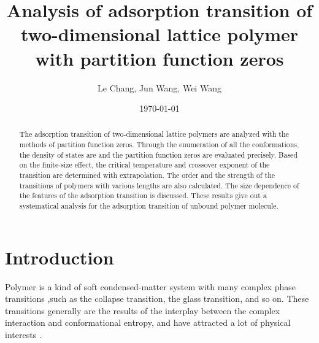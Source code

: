 \documentclass[aps,pre,twocolumn,showpacs,preprintnumbers,amsmath,amssymb]{revtex4-1}
\begin{document}
\title{Analysis of adsorption transition of two-dimensional lattice
polymer with partition function zeros}
\author{Le Chang, Jun Wang, Wei Wang}


\date{\today}

\begin{abstract}
The adsorption transition of two-dimensional lattice polymers are
analyzed with the methods of partition function zeros. Through the
enumeration of all the conformations, the density of states are
and the partition function zeros are evaluated precisely. Based on
the finite-size effect, the critical temperature and crossover exponent
of the transition are determined with extrapolation. The order and the
strength of the transitions of polymers with various lengths are also
calculated. The size dependence of the features of the adsorption
transition is discussed. These results give out a systematical
analysis for the adsorption transition of unbound polymer molecule.
\end{abstract}


\maketitle

\section{Introduction}

Polymer is a kind of soft condensed-matter system with many complex
phase transitions \cite{LifshitzRMP78,PrivmanBook81,ChengBook08,
deGennesBook79,PhysRep},such as the collapse transition\cite{FloryJCP49,
FloryBOOK67,WilliamsARPC81,OYJCP08}, the glass transition\cite{GibbsJCP58,
JackleRPP86}, and so on. These transitions generally are the results
of the interplay between the complex interaction and conformational
entropy, and have attracted a lot of physical interests
\cite{LifshitzRMP78,FloryJCP49,FloryBOOK67,WilliamsARPC81,GibbsJCP58,
JackleRPP86,deGennesBook79,StephenPLA75,RigByJCP1987,BellRMP93,
ChengARMR,PrivmanBook81,ZivPCCP09,ChengBook08,PCCP10,JCP09,JCP09b,JCP10,
PRL95,PhysRep,OYJCP08,BinderBook95}.
\end{document}
